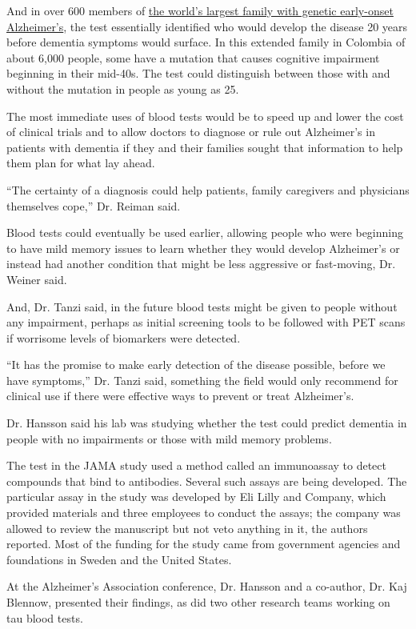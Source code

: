 And in over 600 members of
\href{https://www.nytimes.com/2010/06/02/health/02alzheimers.html}{the
world's largest family with genetic early-onset Alzheimer's}, the test
essentially identified who would develop the disease 20 years before
dementia symptoms would surface. In this extended family in Colombia of
about 6,000 people, some have a mutation that causes cognitive
impairment beginning in their mid-40s. The test could distinguish
between those with and without the mutation in people as young as 25.

The most immediate uses of blood tests would be to speed up and lower
the cost of clinical trials and to allow doctors to diagnose or rule out
Alzheimer's in patients with dementia if they and their families sought
that information to help them plan for what lay ahead.

``The certainty of a diagnosis could help patients, family caregivers
and physicians themselves cope,'' Dr. Reiman said.

Blood tests could eventually be used earlier, allowing people who were
beginning to have mild memory issues to learn whether they would develop
Alzheimer's or instead had another condition that might be less
aggressive or fast-moving, Dr. Weiner said.

And, Dr. Tanzi said, in the future blood tests might be given to people
without any impairment, perhaps as initial screening tools to be
followed with PET scans if worrisome levels of biomarkers were detected.

``It has the promise to make early detection of the disease possible,
before we have symptoms,'' Dr. Tanzi said, something the field would
only recommend for clinical use if there were effective ways to prevent
or treat Alzheimer's.

Dr. Hansson said his lab was studying whether the test could predict
dementia in people with no impairments or those with mild memory
problems.

The test in the JAMA study used a method called an immunoassay to detect
compounds that bind to antibodies. Several such assays are being
developed. The particular assay in the study was developed by Eli Lilly
and Company, which provided materials and three employees to conduct the
assays; the company was allowed to review the manuscript but not veto
anything in it, the authors reported. Most of the funding for the study
came from government agencies and foundations in Sweden and the United
States.

At the Alzheimer's Association conference, Dr. Hansson and a co-author,
Dr. Kaj Blennow, presented their findings, as did two other research
teams working on tau blood tests.

